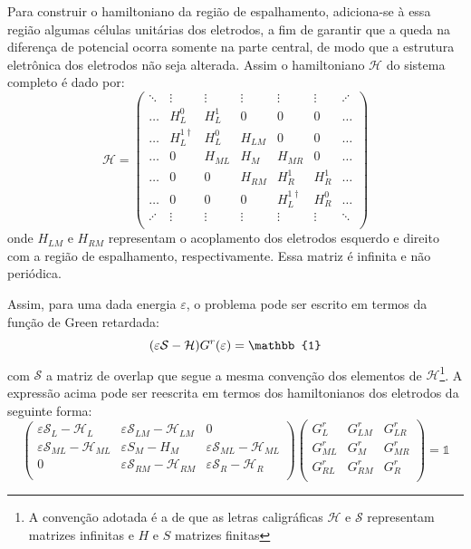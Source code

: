 Para construir o hamiltoniano da região de espalhamento, adiciona-se à essa região algumas células unitárias dos eletrodos, a fim de garantir que a queda na diferença de potencial ocorra somente na parte central, de modo que a estrutura eletrônica dos eletrodos não seja alterada. Assim o hamiltoniano $\mathcal{H}$ do sistema completo é dado por:
\begin{equation}\label{eq:matriz}
\mathcal{H}=\begin{pmatrix}
\ddots & \vdots  & \vdots & \vdots & \vdots & \vdots & \iddots \\
\ldots  & H_L^0 & H_L^1 & 0 & 0 & 0 & \ldots \\
\ldots & H_L^{1\dagger} & H_L^0 & H_{LM} & 0 & 0 & \ldots \\
\ldots & 0 & H_{ML} & H_{M} & H_{MR} & 0 &\ldots  \\
\ldots & 0 &0  & H_{RM} & H_R^1 & H^1_R &\ldots  \\
\ldots & 0 & 0 & 0 & H_L^{1\dagger} & H_R^0 &\ldots \\
\iddots& \vdots & \vdots & \vdots & \vdots & \vdots & \ddots \\
\end{pmatrix}
\end{equation}
onde $H_{LM}$ e $H_{RM}$ representam o acoplamento dos eletrodos esquerdo e direito com a região de espalhamento, respectivamente. Essa matriz é infinita e não periódica.

Assim, para uma dada energia $\varepsilon$, o problema pode ser escrito em termos da função de Green retardada:
\begin{equation}
    \pqty{\varepsilon\mathcal{S}-\mathcal{H}}G^r(\varepsilon)=\mathbb{1}
\end{equation}
com $\mathcal{S}$ a matriz de overlap que segue a mesma convenção dos elementos de $\mathcal{H}$\footnote{A convenção adotada é a de que as letras caligráficas $\mathcal{H}$ e $\mathcal{S}$ representam matrizes infinitas e $H$ e $S$ matrizes finitas}. A expressão acima pode ser reescrita em termos dos hamiltonianos dos eletrodos da seguinte forma:
\begin{equation}\label{eq:matriz-esparsa}
    \begin{pmatrix}
\varepsilon\mathcal{S}_{L}-\mathcal{H}_{L} & \varepsilon\mathcal{S}_{LM}-\mathcal{H}_{LM} &0  \\
 \varepsilon\mathcal{S}_{ML}-\mathcal{H}_{ML}&\varepsilon S_{M}-H_{M}  &\varepsilon\mathcal{S}_{ML}-\mathcal{H}_{ML}  \\
0& \varepsilon\mathcal{S}_{RM}-\mathcal{H}_{RM} & \varepsilon\mathcal{S}_{R}-\mathcal{H}_{R} \\
\end{pmatrix}\begin{pmatrix}
G^r_{L} & G^r_{LM} &G^r_{LR}  \\
G^r_{ML} &G^r_{M}  & G^r_{MR} \\
G^r_{RL} &G^r_{RM}  &G^r_{R} \\
\end{pmatrix}=\mathbb{1}
\end{equation}

